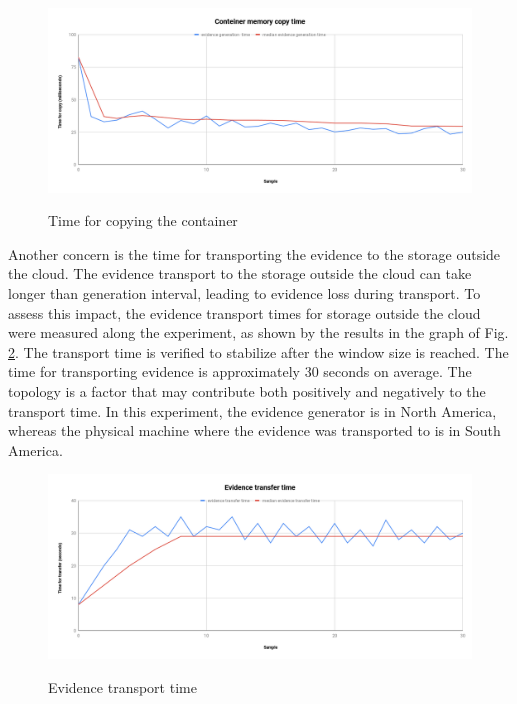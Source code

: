 \documentclass[conference]{IEEEtran}
\begin{document}
\begin{figure}[h!]
\footnotesize
\caption{Time for copying the container}
\includegraphics[scale=0.40]{memoria_copia_ieee.png}
\centering
\label{fig:memoria_copia}
\end{figure}


Another concern is the time for transporting the evidence to the storage outside the cloud.
%
The evidence transport to the storage outside the cloud can take longer than generation interval, leading to evidence loss during transport. 
%
To assess this impact, the evidence transport times for storage outside the cloud were measured along the experiment, as shown by the results in the graph of Fig. \ref{fig:evidencia_transporte}.
%
The transport time is verified to stabilize after the window size is reached. 
%
The time for transporting evidence is approximately 30 seconds on average. 
%
The topology is a factor that may contribute both positively and negatively to the transport time. 
%
In this experiment, the evidence generator is in North America, whereas the physical machine where the evidence was transported to is in South America.

\begin{figure}[htb!]
\footnotesize
\caption{Evidence transport time}
\includegraphics[scale=0.40]{evidencia_download_ieee.png}
\centering
\label{fig:evidencia_transporte}
\end{figure}
\end{document}

